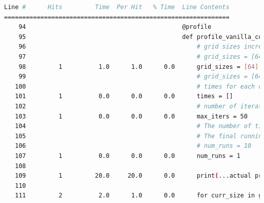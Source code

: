 \documentclass[a4paper,12pt]{article}
\begin{document}
\begin{lstlisting}[language=bash,basicstyle=\tiny\ttfamily]
Line #      Hits         Time  Per Hit   % Time  Line Contents
==============================================================
    94                                           @profile                                                                                        
    95                                           def profile_vanilla_computation(update_method_key):                                             
    96                                               # grid sizes increase by powers of 2                                                        
    97                                               # grid_sizes = [64, 128, 256, 512, 1024]                                                    
    98         1          1.0      1.0      0.0      grid_sizes = [64]                                                                           
    99                                               # grid_sizes = [64, 128]                                                                    
   100                                               # times for each of the computations (in seconds)                                           
   101         1          0.0      0.0      0.0      times = []                                                                                  
   102                                               # number of iterations for which the updates will happen                                    
   103         1          0.0      0.0      0.0      max_iters = 50                                                                              
   104                                               # The number of times the run will be performed for each grid size.                         
   105                                               # The final running time reported will be the average of these runs                         
   106                                               # num_runs = 10                                                                             
   107         1          0.0      0.0      0.0      num_runs = 1                                                                                
   108                                                                                                                                           
   109         1         20.0     20.0      0.0      print(...actual print statement omitted for space...)
   110                                                                                                                                           
   111         2          2.0      1.0      0.0      for curr_size in grid_sizes:                                                                

\end{lstlisting}
\end{document}
